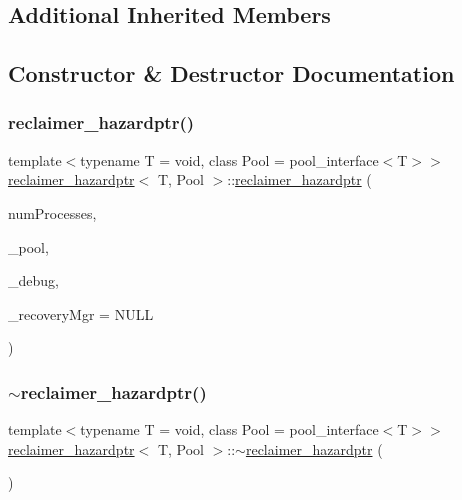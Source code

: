 \subsection*{Additional Inherited Members}


\subsection{Constructor \& Destructor Documentation}
\mbox{\label{classreclaimer__hazardptr_a14615c6826dcd3856b4b9fb82fa58fa0}} 
\subsubsection{\texorpdfstring{reclaimer\+\_\+hazardptr()}{reclaimer\_hazardptr()}}
{\footnotesize\ttfamily template$<$typename T  = void, class Pool  = pool\+\_\+interface$<$\+T$>$$>$ \\
\hyperlink{classreclaimer__hazardptr}{reclaimer\+\_\+hazardptr}$<$ T, Pool $>$\+::\hyperlink{classreclaimer__hazardptr}{reclaimer\+\_\+hazardptr} (\begin{DoxyParamCaption}\item[{const int}]{num\+Processes,  }\item[{Pool $\ast$}]{\+\_\+pool,  }\item[{\hyperlink{classdebugInfo}{debug\+Info} $\ast$const}]{\+\_\+debug,  }\item[{\hyperlink{classRecoveryMgr}{Recovery\+Mgr}$<$ void $\ast$$>$ $\ast$const}]{\+\_\+recovery\+Mgr = {\ttfamily NULL} }\end{DoxyParamCaption})\hspace{0.3cm}{\ttfamily [inline]}}

\mbox{\label{classreclaimer__hazardptr_a1efb6e4ae96cea810d2c08ba35c5e2a7}} 
\subsubsection{\texorpdfstring{$\sim$reclaimer\+\_\+hazardptr()}{~reclaimer\_hazardptr()}}
{\footnotesize\ttfamily template$<$typename T  = void, class Pool  = pool\+\_\+interface$<$\+T$>$$>$ \\
\hyperlink{classreclaimer__hazardptr}{reclaimer\+\_\+hazardptr}$<$ T, Pool $>$\+::$\sim$\hyperlink{classreclaimer__hazardptr}{reclaimer\+\_\+hazardptr} (\begin{DoxyParamCaption}{ }\end{DoxyParamCaption})\hspace{0.3cm}{\ttfamily [inline]}}



